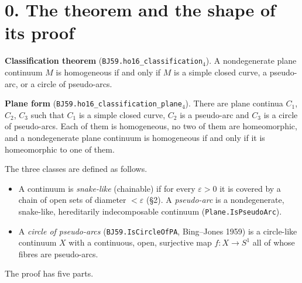 \documentclass[11pt]{article}
\newcommand{\lean}[1]{\texttt{#1}}
\begin{document}
\bigskip

\tableofcontents

\section*{0. The theorem and the shape of its proof}

\textbf{Classification theorem} (\lean{BJ59.\hspace{0pt}ho16\_\hspace{0pt}classification$_{4}$}). A nondegenerate plane continuum $M$ is homogeneous if and only if $M$ is a simple closed curve, a pseudo-arc, or a circle of pseudo-arcs.

\textbf{Plane form} (\lean{BJ59.\hspace{0pt}ho16\_\hspace{0pt}classification\_\hspace{0pt}plane$_{4}$}). There are plane continua $C_1$, $C_2$, $C_3$ such that $C_1$ is a simple closed curve, $C_2$ is a pseudo-arc and $C_3$ is a circle of pseudo-arcs. Each of them is homogeneous, no two of them are homeomorphic, and a nondegenerate plane continuum is homogeneous if and only if it is homeomorphic to one of them.

The three classes are defined as follows.

\begin{itemize}
  \item A continuum is \emph{snake-like} (chainable) if for every $\varepsilon > 0$ it is covered by a chain of open sets of diameter $< \varepsilon$ (\S{}2). A \emph{pseudo-arc} is a nondegenerate, snake-like, hereditarily indecomposable continuum (\lean{Plane.\hspace{0pt}IsPseudoArc}).
  \item A \emph{circle of pseudo-arcs} (\lean{BJ59.\hspace{0pt}IsCircleOfPA}, Bing--Jones 1959) is a circle-like continuum $X$ with a continuous, open, surjective map $f : X \to S^1$ all of whose fibres are pseudo-arcs.
\end{itemize}

The proof has five parts.
\end{document}
